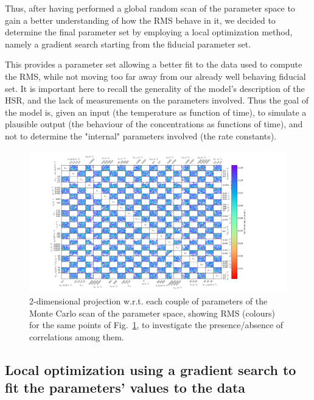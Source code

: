 \documentclass[oneside, 10pt, a4paper, twocolumn]{article}
\begin{document}
Thus, after having performed a global random scan of the parameter space to gain a better understanding of how the RMS behave in it, we decided to determine the final parameter set by employing a local optimization method, namely a gradient search starting from the fiducial parameter set.

This provides a parameter set allowing a better fit to the data used to compute the RMS, while not moving too far away from our already well behaving fiducial set. 
It is important here to recall the generality of the model's description of the HSR, and the lack of measurements on the parameters involved. Thus the goal of the model is, given an input (the temperature as function of time), to simulate a plausible output (the behaviour of the concentrations as functions of time), and not to determine the "internal" parameters involved (the rate constants). 

\begin{figure}
\centering %
\hspace*{-1.6cm}\includegraphics[width=1.3\textwidth, height=0.55\textheight]{ScatterPlot400.pdf}
\caption{2-dimensional projection w.r.t. each couple of parameters of the Monte Carlo scan of the parameter space, showing RMS (colours) for the same points of Fig.~\ref{Figure1}, to investigate the presence/absence of correlations among them.
}
\label{Figure1}
\end{figure}




\subsection{Local optimization using a gradient search to fit the parameters' values to the data}
\end{document}
